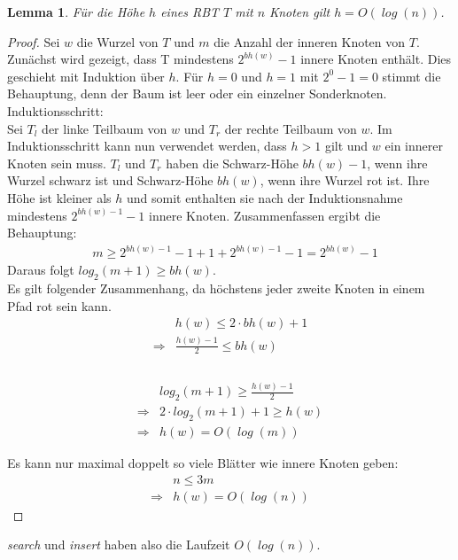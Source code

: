 \documentclass[a4paper,12pt]{article}
\newtheorem{Lemma}{Lemma}[section]
\begin{document}
\begin{Lemma} Für die Höhe $h$ eines RBT $T$ mit $n$ Knoten gilt $h = \mathit{O\left(\log \left(n\right)\right)}$. 
\end{Lemma}
\begin{proof}
	Sei $w$ die Wurzel von $T$ und $m$ die Anzahl der inneren Knoten von $T$. 
	Zunächst wird gezeigt, dass T mindestens $2^\mathit{bh(w)} - 1$ innere Knoten enthält.
	Dies geschieht mit Induktion über $h$. Für $h = 0$ und  $h = 1$ mit $2^0 - 1 = 0 $ stimmt die Behauptung, denn der Baum ist leer oder ein einzelner Sonderknoten. \\ 
	Induktionsschritt:\\
	Sei $T_l$ der linke Teilbaum von $w$ und $T_r$ der rechte Teilbaum von $w$.  
	Im Induktionsschritt kann nun verwendet werden, dass $h > 1$ gilt und $w$ ein innerer Knoten sein muss. $T_l$ und $T_r$ haben die Schwarz-Höhe $\mathit{bh(w)} - 1$, wenn ihre Wurzel schwarz ist und Schwarz-Höhe $\mathit{bh(w)}$, wenn ihre Wurzel rot ist. Ihre Höhe ist kleiner als $h$ und somit enthalten sie nach der Induktionsnahme mindestens  $2^\mathit{bh(w)- 1} - 1$ innere Knoten. Zusammenfassen ergibt die Behauptung:\\    
	\begin{align*}
	&m \geq 2^\mathit{bh(w)- 1} - 1  + 1  + 2^\mathit{bh(w)- 1} - 1 = 2^\mathit{bh(w)} - 1
	\end{align*}
	Daraus folgt $log_2(m + 1) \geq\mathit{bh(w)}$.\\
    Es gilt folgender Zusammenhang, da höchstens jeder zweite Knoten in einem Pfad rot sein kann.\\
	\begin{align*}
	&\mathit{h(w)} \leq 2 \cdot \mathit{bh(w) } + 1 \\
	\Rightarrow &\frac{\mathit{h(w)} - 1}{2} \leq\mathit{bh(w) } \\
	\end{align*}
	\\
	\begin{align*}
	&log_2(m + 1) \geq\frac{\mathit{h(w)} - 1}{2} \\
	\Rightarrow	&2 \cdot log_2(m + 1) + 1 \geq\mathit{h(w)} \\
	\Rightarrow &\mathit{h(w)} = \mathit{O\left(\log \left( {m}\right)\right)} 
	\end{align*}
	
	
	
	
	
	
	\noindent Es kann nur maximal doppelt so viele Blätter wie innere Knoten geben:
	\begin{align*}
	&n  \leq 3 m \\
	\Rightarrow &\mathit{h(w)} = \mathit{O\left(\log \left({n}\right)\right)} 
	\end{align*} 
	
	
\end{proof}
\noindent \textit{search} und \textit{insert} haben also die Laufzeit $\mathit{O\left(\log \left({n}\right)\right)}$.
\end{document}
